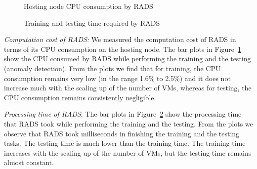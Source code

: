 \begin{figure}[!h]
  \vspace{-0.2cm}
  \centering
   {}
   \caption{Hosting node CPU consumption by RADS}
  \label{fig:overhead_cpu}
  \vspace{-0.1cm}
\end{figure}

\begin{figure}[!h]
  \vspace{-0.2cm}
  \centering
   {}
   \caption{Training and testing time required by RADS}
  \label{fig:overhead_time}
  \vspace{-0.1cm}
\end{figure}

\textit{Computation cost of RADS:} We measured the computation cost of RADS in terms of its CPU consumption on the hosting node. 
The bar plots in Figure~\ref{fig:overhead_cpu} show the CPU consumed by RADS while performing the training and the testing (anomaly detection).
From the plots we find that for training, the CPU consumption remains very low (in the range 1.6\% to 2.5\%) and it does not increase much with the scaling up of the number of VMs, whereas for testing, the CPU consumption remains consistently negligible. 

\textit{Processing time of RADS}: The bar plots in Figure~\ref{fig:overhead_time} show the processing time that RADS took while performing the training and the testing. From the plots we observe that RADS took milliseconds in finishing the training and the testing tasks. The testing time is much lower than the training time. 
The training time increases with the scaling up of the number of VMs, but the testing time remains almost constant. 

